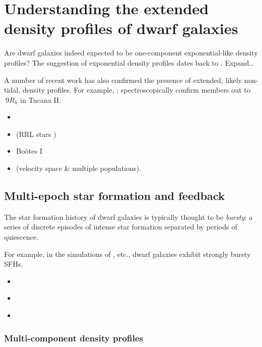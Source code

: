 \section{Understanding the extended density profiles of dwarf
galaxies}\label{understanding-the-extended-density-profiles-of-dwarf-galaxies}

Are dwarf galaxies indeed expected to be one-component exponential-like
density profiles? The suggestion of exponential density profiles dates
back to \citet{faber+lin1983}. Expand\ldots{}

A number of recent work has also confirmed the presence of extended,
likely non-tidal, density profiles. For example, \citet{chiti+2021};
\citet{chiti+2023} spectroscopically confirm members out to \(~9 R_h\)
in Tucana II.

\begin{itemize}
\tightlist
\item
  \citet{revaz+jablonka2018}
\item
  \citet{tau+vivas+martinez-vazquez2024} (RRL stars )
\item
  \citet{roderick+2016} Boötes I
\item
  \citet{mcconnachie+penarrubia+navarro2007} (velocity space \& multiple
  populations).
\end{itemize}

\subsection{Multi-epoch star formation and
feedback}\label{multi-epoch-star-formation-and-feedback}

The star formation history of dwarf galaxies is typically thought to be
\emph{bursty}: a series of discrete episodes of intense star formation
separated by periods of quiescence.

For example, in the simulations of \citet{wheeler+2019}, etc., dwarf
galaxies exhibit strongly bursty SFHs.

\begin{itemize}
\tightlist
\item
  \citet{maxwell+2012}
\item
  \citet{wright+2019}
\item
  \citet{azartash-namin+2024}
\end{itemize}

\subsubsection{Multi-component density
profiles}\label{multi-component-density-profiles}

